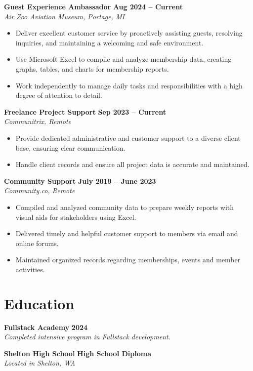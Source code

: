 \documentclass[a4paper,11pt]{article}
\begin{document}
\textbf{Guest Experience Ambassador} \hfill \textbf{Aug 2024 -- Current} \\
\textit{Air Zoo Aviation Museum, Portage, MI}
\begin{itemize}[leftmargin=*, nosep]
    \item Deliver excellent customer service by proactively assisting guests, resolving inquiries, and maintaining a welcoming and safe environment.
    \item Use Microsoft Excel to compile and analyze membership data, creating graphs, tables, and charts for membership reports.
    \item Work independently to manage daily tasks and responsibilities with a high degree of attention to detail.
\end{itemize}
\vspace{0.5em}
\textbf{Freelance Project Support} \hfill \textbf{Sep 2023 -- Current} \\
\textit{Communitrix, Remote}
\begin{itemize}[leftmargin=*, nosep]
    \item Provide dedicated administrative and customer support to a diverse client base, ensuring clear communication.
    \item Handle client records and ensure all project data is accurate and maintained.
\end{itemize}
\vspace{0.5em}
\textbf{Community Support} \hfill \textbf{July 2019 -- June 2023} \\
\textit{Community.co, Remote}
\begin{itemize}[leftmargin=*, nosep]
    \item Compiled and analyzed community data to prepare weekly reports with visual aids for stakeholders using Excel.
    \item Delivered timely and helpful customer support to members via email and online forums.
    \item Maintained organized records regarding memberships, events and member activities.
\end{itemize}

\section{Education}

\textbf{Fullstack Academy} \hfill \textbf{2024} \\
\textit{Completed intensive program in Fullstack development.}

\textbf{Shelton High School} \hfill \textbf{High School Diploma} \\
\textit{Located in Shelton, WA}
\end{document}
